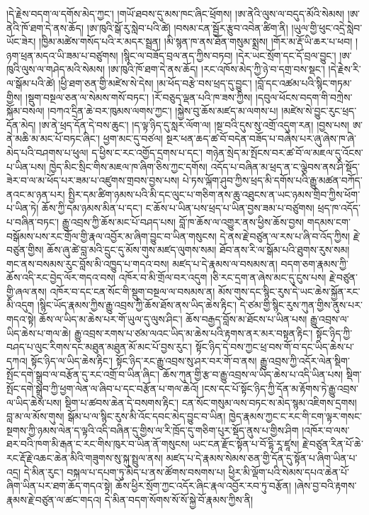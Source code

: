 \documentclass{article}
\begin{document}
།དེ་རྗེས་བདག་ལ་དགོས་མེད་ཀྱང་། །གཡོ་ཐབས་དུ་མས་ཁང་ཞིང་ཕྲོགས། །ཨ་ནེའི་ལུས་ལ་བདུད་མོའི་སེམས། །ཨ་ནེའི་ཁོ་ཐག་དེ་ནས་ཆོད། །ཨ་ཁུའི་སྒོ་རུ་སླེབ་པའི་ཚེ། །བསམ་ངན་སྦྱོར་རྩུབ་འབེན་ཚིག་ནི། །ཡུལ་གྱི་ཕུང་འདྲེ་སླེབ་ཡོང་ཟེར། །ཁྱིམ་མཚེས་གསོད་པའི་ར་མདར་སྦྲན། །མི་སྙན་ཁ་ནས་ཐོན་གསུམ་སྨྲས། །གོར་མ་རྡོ་ཡི་ཆར་པ་ཕབ། །ཉག་ཕྲན་མདའ་ཡི་ཟམ་པ་བཙུགས། །སྙིང་ལ་བཟོད་བྲལ་ནད་ཀྱིས་བཏབ། །དེར་ཡང་སྲོག་དང་དོ་བྲལ་བྱུང་། །ཨ་ཁུའི་ལུས་ལ་གཤེད་མའི་སེམས། །ཨ་ཁུའི་ཁོ་ཐག་དེ་ནས་ཆོད། །རང་འཁོས་མེད་ཀྱི་ཉེ་བ་དགྲ་བས་སྡང་། །དེ་རྗེས་རི་ལ་སྒོམ་པའི་ཚེ། །ཕྱི་ཐག་ཅན་གྱི་མཛེས་སེ་དེས། །མ་ཕོད་བརྩེ་བས་ཕྲད་དུ་བྱུང་། །བློ་དང་འཚམ་པའི་སྙིང་གཏམ་གྱིས། །སྡུག་བསྔལ་ཅན་ལ་སེམས་གསོ་བཏང་། །རོ་བཅུད་ལྡན་པའི་ཁ་ཟས་ཀྱིས། །དབུལ་ཕོངས་བདག་གི་བཀྲེས་སྐོམ་བསལ། །བཀའ་དྲིན་ཆེ་བར་ཁུམས་ལགས་ཀྱང་། །སྐྱེས་བུ་ཆོས་མཛད་མ་ལགས་པ། །མཛེས་སེ་བྱུང་རུང་ཕྲད་དོན་མེད། །ཨ་ནེ་ཕྲད་དོན་དེ་བས་ཆུང་། །ད་ལྟ་ཉིད་དུ་སླར་ལོག་ལ། །སྔ་བའི་དུས་སུ་འགྲོ་འདུག་རན། །བྱས་པས། ཨ་ནེ་མཆི་མ་མང་པོ་བཏང་ཞིང་། ཕྱག་མང་དུ་བཙལ། སྔར་ཕན་ཆད་ཚ་བོ་བདེན་བཟོད་པ་བཞེས་པར་ཞུ་ཞེས་ཁ་ཞེ་མེད་པའི་བཤགས་པ་ཕུལ། ད་ཕྱིས་ང་རང་འགྱོད་དྲགས་པ་དང་། གཉེན་སྲེད་མ་སྤོངས་བར་ཚ་བོ་ལ་མཇལ་དུ་འོངས་པ་ཡིན་པས། ཁྱེད་མིང་སྲིང་གིས་མཇལ་ཁ་ཞིག་ཅིས་ཀྱང་དགོས། འདོད་པ་བཞིན་མ་ཕྲད་ན་ང་ལྕེབས་ནས་ཤི་སྡོད་ཟེར་བ་ལ་མ་ཕོད་པར་ཟམ་པ་འཛུགས་གྲབས་བྱས་པས། པེ་ཏས་ལྐོག་ཤུབ་ཀྱིས་ཕྲད་མི་དགོས་པའི་རྒྱུ་མཚན་བཀོད་ནའང་མ་ཉན་པར། སྤྱིར་དམ་ཚིག་ཉམས་པའི་མི་དང་ལུང་པ་གཅིག་ནས་ཆུ་འཐུངས་ན་ཡང་ཉམས་གྲིབ་ཀྱིས་ཕོག་པ་ཡིན་ཏེ། ཆོས་ཀྱི་དམ་ཉམས་མིན་པ་དང་། ང་ཆོས་པ་ཡིན་པས་ཕྲད་པ་ཡིན་བྱས་ཟམ་པ་བཙུགས། ཕྲད་ཁ་འདོད་པ་བཞིན་བཏང་། རྒྱུ་འབྲས་ཀྱི་ཆོས་མང་པོ་བཤད་པས། བློ་ཁ་ཆོས་ལ་འགྱུར་ནས་ཕྱིས་ཆོས་བྱས། གདམས་ངག་བསྒོམས་པས་རང་གྲོལ་གྱི་རྣལ་འབྱོར་མ་ཞིག་བྱུང་བ་ཡིན་གསུངས། དེ་ནས་རྗེ་བཙུན་ལ་རས་པ་ཞི་བ་འོད་ཀྱིས། རྗེ་བཙུན་གྱིས། ཆོས་ཞུ་ཚེ་བླ་མའི་དྲུང་དུ་མོས་གུས་མཛད་ལུགས་སམ། ཐོབ་ནས་རི་ལ་སྒོམ་པའི་ཐུགས་རུས་སམ། གང་ནས་བསམས་རུང་བློས་མི་འཁྱུད་པ་གདའ་བས། མཛད་པ་དེ་རྣམས་ལ་བསམས་ན། བདག་ཅག་རྣམས་ཀྱི་ཆོས་འདི་རང་བྱེད་ལོར་གདའ་བས། འཁོར་བ་མི་གྲོལ་བར་འདུག །ཅི་རང་དྲག་ན་ཞེས་མང་དུ་ངུས་པས། རྗེ་བཙུན་གྱི་ཞལ་ནས། འཁོར་བ་དང་ངན་སོང་གི་སྡུག་བསྔལ་ལ་བསམས་ན། མོས་གུས་དང་སྙིང་རུས་དེ་ཡང་ཆེས་སྐྱོན་རང་མི་འདུག །སྙིང་ཡོད་རྣམས་ཀྱིས་རྒྱུ་འབྲས་ཀྱི་ཆོས་ཐོས་ནས་ཡིད་ཆེས་རྟིང་། དེ་ཙམ་གྱི་སྙིང་རུས་ཀུན་གྱིས་ནུས་པར་གདའ་སྟེ། ཆོས་ལ་ཡིད་མ་ཆེས་པར་གོ་ཡུལ་དུ་ལུས་ཤིང་། ཆོས་བརྒྱད་བློས་མ་ཐོངས་པ་ཡིན་པས། རྒྱུ་འབྲས་ལ་ཡིད་ཆེས་པ་གལ་ཆེ། རྒྱུ་འབྲས་རགས་པ་ཙམ་ལའང་ཡིད་མ་ཆེས་པའི་རྟགས་ནར་མར་བསྟན་རྟིང་། སྟོང་ཉིད་ཀྱི་བཤད་པ་ལུང་རིགས་དང་མཐུན་མཐུན་མོ་མང་པོ་བྱས་རུང་། སྟོང་ཉིད་དེ་བས་ཀྱང་ཕྲ་བས་གོ་བ་དང་ཡིད་ཆེས་པ་དཀའ། སྟོང་ཉིད་ལ་ཡིད་ཆེས་རྟིང་། སྟོང་ཉིད་རང་རྒྱུ་འབྲས་སུ་ཤར་བར་གོ་བ་ནས། རྒྱུ་འབྲས་ཀྱི་འདོར་ལེན་སྡིག་སྤོང་དགེ་སྒྲུབ་ལ་བརྩོན་དུ་རང་འགྲོ་བ་ཡིན་ཞིང་། ཆོས་ཀུན་གྱི་རྩ་བ་རྒྱུ་འབྲས་ལ་ཡིད་ཆེས་པ་འདི་ཡིན་པས། སྡིག་སྤོང་དགེ་སྒྲུབ་ཀྱི་ཕྱག་ལེན་ལ་ཞིབ་པ་དང་བརྩོན་པ་གལ་ཆེའོ། །ངས་དང་པོ་སྟོང་ཉིད་ཀྱི་དོན་མ་རྟོགས་ཏེ་རྒྱུ་འབྲས་ལ་ཡིད་ཆེས་པས། སྡིག་པ་ཚབས་ཆེན་དེ་བསགས་རྟིང་། ངན་སོང་གསུམ་ལས་བཏང་ས་མེད་སྙམ་འཇིགས་དྲགས། བླ་མ་ལ་མོས་གུས། སྒོམ་པ་ལ་སྙིང་རུས་མི་འོང་དབང་མེད་བྱུང་བ་ཡིན། ཁྱེད་རྣམས་ཀྱང་ང་རང་གི་ངག་ལྟར་གསང་སྔགས་ཀྱི་ཉམས་ལེན་ད་ལྟའི་འདི་བཞིན་དུ་གྱིས་ལ་རི་ཁྲོད་དུ་གཅིག་པུར་སྡོད་ནུས་པ་གྱིས་ཤིག །འཁོར་བ་ལས་ཐར་བའི་ཁག་མི་རྒན་ང་རང་གིས་ཁུར་བ་ཡིན་ནོ་གསུངས། ཡང་ངན་རྫོང་སྟོན་པ་བོ་དྷི་རཱ་ཛཱས། རྗེ་བཙུན་རིན་པོ་ཆེ་རང་རྡོ་རྗེ་འཆང་ཆེན་མིའི་གཟུགས་སུ་སྐུ་སྤྲུལ་ནས། མཛད་པ་དེ་རྣམས་སེམས་ཅན་གྱི་དོན་དུ་སྟོན་པ་ཞིག་ཡིན་པ་འདྲ། དེ་མིན་རུང་། བསྐལ་པ་དཔག་ཏུ་མེད་པ་ནས་ཚོགས་བསགས་པ། ཕྱིར་མི་ལྡོག་པའི་སེམས་དཔའ་ཆེན་པོ་ཞིག་ཡིན་པར་ཐག་ཆོད་གདའ་སྟེ། ཆོས་ཕྱིར་སྲོག་ཀྱང་འདོར་ཞིང་རྣལ་འབྱོར་རབ་ཏུ་བརྩོན། །ཞེས་བྱ་བའི་རྟགས་རྣམས་རྗེ་བཙུན་ལ་ཚང་གདའ། དེ་མིན་བདག་སོགས་སོ་སོ་སྐྱེ་བོ་རྣམས་ཀྱིས་ནི། 
\end{document}
